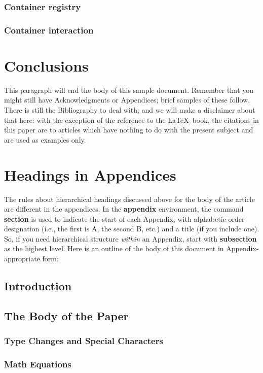 \subsubsection{Container registry}

\subsubsection{Container interaction}


\section{Conclusions}
This paragraph will end the body of this sample document.
Remember that you might still have Acknowledgments or
Appendices; brief samples of these
follow.  There is still the Bibliography to deal with; and
we will make a disclaimer about that here: with the exception
of the reference to the \LaTeX\ book, the citations in
this paper are to articles which have nothing to
do with the present subject and are used as
examples only.



\appendix
\section{Headings in Appendices}
The rules about hierarchical headings discussed above for
the body of the article are different in the appendices.
In the \textbf{appendix} environment, the command
\textbf{section} is used to
indicate the start of each Appendix, with alphabetic order
designation (i.e., the first is A, the second B, etc.) and
a title (if you include one).  So, if you need
hierarchical structure
\textit{within} an Appendix, start with \textbf{subsection} as the
highest level. Here is an outline of the body of this
document in Appendix-appropriate form:
\subsection{Introduction}
\subsection{The Body of the Paper}
\subsubsection{Type Changes and  Special Characters}
\subsubsection{Math Equations}

